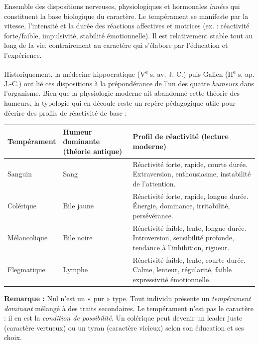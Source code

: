 \documentclass[11pt]{article}
\newcommand{\cle}[1]{{\popxbold\color{popdark}#1}}
\begin{document}
\begin{definition}[Tempérament]
Ensemble des dispositions nerveuses, physiologiques et hormonales \emph{innées} qui constituent la base biologique du caractère. Le tempérament se manifeste par la vitesse, l'intensité et la durée des réactions affectives et motrices (ex. : réactivité forte/faible, impulsivité, stabilité émotionnelle). Il est relativement stable tout au long de la vie, contrairement au caractère qui s'élabore par l'éducation et l'expérience.
\end{definition}

Historiquement, la médecine hippocratique (V\textsuperscript{e} s. av. J.-C.) puis Galien (II\textsuperscript{e} s. ap. J.-C.) ont lié ces dispositions à la prépondérance de l'un des quatre \emph{humeurs} dans l'organisme. Bien que la physiologie moderne ait abandonné cette théorie des humeurs, la typologie qui en découle reste un repère pédagogique utile pour décrire des profils de réactivité de base :

\begin{center}
\begin{tabularx}{\linewidth}{|l|X|X|}\hline
\textbf{Tempérament} & \textbf{Humeur dominante (théorie antique)} & \textbf{Profil de réactivité (lecture moderne)} \\ \hline
\cle{Sanguin} & Sang & Réactivité forte, rapide, courte durée. Extraversion, enthousiasme, instabilité de l'attention. \\ \hline
\cle{Colérique} & Bile jaune & Réactivité forte, rapide, longue durée. Énergie, dominance, irritabilité, persévérance. \\ \hline
\cle{Mélancolique} & Bile noire & Réactivité faible, lente, longue durée. Introversion, sensibilité profonde, tendance à l'inhibition, rigueur. \\ \hline
\cle{Flegmatique} & Lymphe & Réactivité faible, lente, courte durée. Calme, lenteur, régularité, faible expressivité émotionnelle. \\ \hline
\end{tabularx}
\end{center}

\noindent
\textbf{Remarque :} Nul n'est un « pur » type. Tout individu présente un \emph{tempérament dominant} mélangé à des traits secondaires. Le tempérament n'est pas le caractère : il en est la \emph{condition de possibilité}. Un colérique peut devenir un leader juste (caractère vertueux) ou un tyran (caractère vicieux) selon son éducation et ses choix.
\end{document}
